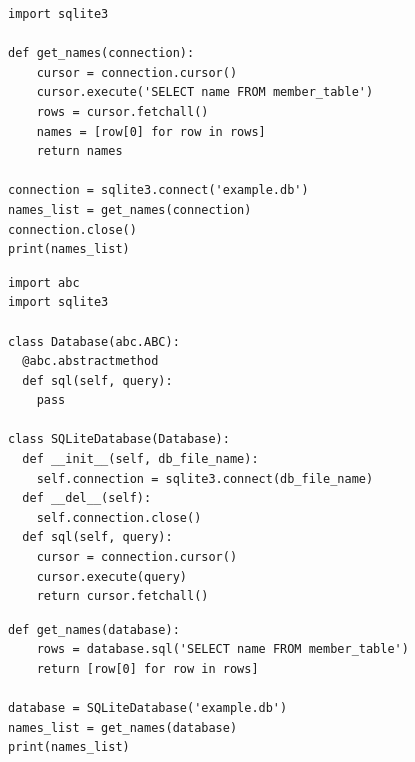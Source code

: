 \documentclass[calcdimensions,landscape,letterpaper]{powersem}
\newcommand{\thecurrentheading}{}
\newcommand{\heading}[1]{\renewcommand{\thecurrentheading}{#1}}
\begin{document}
\begin{slide}
  \heading{Dependency Inversion - Before}
  \begin{center}
    \begin{verbatim}
import sqlite3

def get_names(connection):
    cursor = connection.cursor()
    cursor.execute('SELECT name FROM member_table')
    rows = cursor.fetchall()
    names = [row[0] for row in rows]
    return names

connection = sqlite3.connect('example.db')
names_list = get_names(connection)
connection.close()
print(names_list)
    \end{verbatim}
  \end{center}
\end{slide}

\begin{slide}
  \heading{Dependency Inversion - After}
  \begin{center}
    \begin{verbatim}
import abc
import sqlite3

class Database(abc.ABC):
  @abc.abstractmethod
  def sql(self, query):
    pass

class SQLiteDatabase(Database):
  def __init__(self, db_file_name):
    self.connection = sqlite3.connect(db_file_name)
  def __del__(self):
    self.connection.close()
  def sql(self, query):
    cursor = connection.cursor()
    cursor.execute(query)
    return cursor.fetchall()
    \end{verbatim}
  \end{center}
\end{slide}

\begin{slide}
  \heading{Dependency Inversion - After}
  \begin{center}
    \begin{verbatim}
def get_names(database):
    rows = database.sql('SELECT name FROM member_table')
    return [row[0] for row in rows]

database = SQLiteDatabase('example.db')
names_list = get_names(database)
print(names_list)
    \end{verbatim}
  \end{center}
\end{slide}

\begin{slide}
  \heading{SOLID Overview}
  \begin{center}
  \end{center}
\end{slide}
\end{document}
